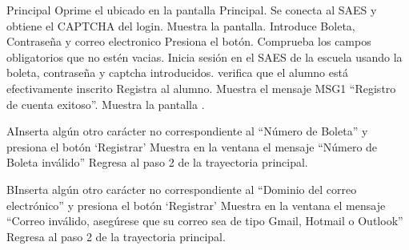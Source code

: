 \begin{UCtrayectoria}{Principal}
	\UCpaso[\UCactor] Oprime el  ubicado en la pantalla Principal.
	\UCpaso Se conecta al SAES y obtiene el CAPTCHA del login.
	\UCpaso Muestra la pantalla.
	\UCpaso[\UCactor] Introduce Boleta, Contraseña y correo electronico
	\UCpaso[\UCactor] Presiona el botón.
	\UCpaso Comprueba los campos obligatorios que no estén vacias.
	\UCpaso Inicia sesión en el SAES de la escuela usando la boleta, contraseña y captcha introducidos.
	\UCpaso verifica que el alumno está efectivamente inscrito  
	\UCpaso Registra al alumno.
	\UCpaso Muestra el mensaje MSG1 “Registro de cuenta exitoso”.
	\UCpaso Muestra la pantalla .
\end{UCtrayectoria}

\begin{UCtrayectoriaA}{A}{Inserta algún otro carácter no correspondiente al “Número de Boleta” y presiona el botón ‘Registrar’}
	\UCpaso Muestra en la ventana el mensaje “Número de Boleta inválido”
	\UCpaso Regresa al paso 2 de la trayectoria principal.
\end{UCtrayectoriaA}

\begin{UCtrayectoriaA}{B}{Inserta algún otro carácter no correspondiente al “Dominio del correo electrónico” y presiona el botón ‘Registrar’}
	\UCpaso Muestra en la ventana el mensaje “Correo inválido, asegúrese que su correo sea de tipo Gmail, Hotmail o Outlook”
	\UCpaso Regresa al paso 2 de la trayectoria principal.
\end{UCtrayectoriaA}